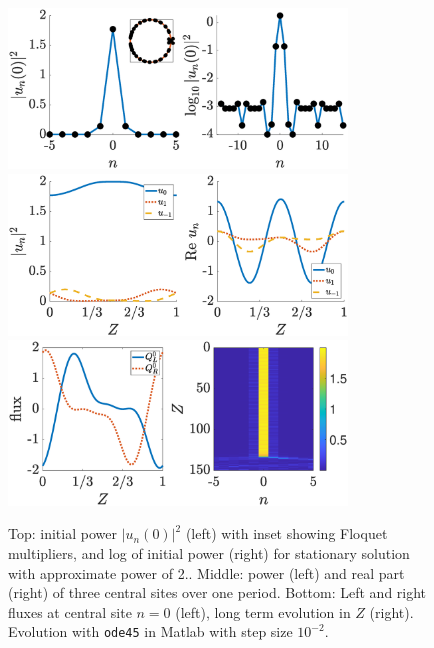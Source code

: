 \documentclass[reprint, amsmath,amssymb,aps,pre]{revtex4-2}
\begin{document}
\begin{figure}
    \centering
    \includegraphics[width=9cm]{stat2a.eps}
    \includegraphics[width=9cm]{stat2b.eps}
    \includegraphics[width=9cm]{stat2c.eps}
    \caption{Top: initial power $|u_n(0)|^2$ (left) with inset showing Floquet multipliers, and log of initial power (right) for stationary solution with approximate power of 2.. Middle: power (left) and real part (right) of three central sites over one period. Bottom: Left and right fluxes at central site $n=0$ (left), long term evolution in $Z$ (right). Evolution with \texttt{ode45} in Matlab with step size $10^{-2}$.}
    \label{fig:stat2}
\end{figure}
\end{document}
